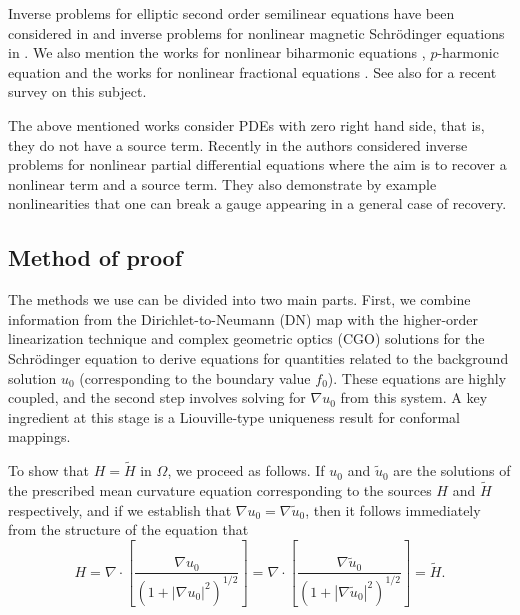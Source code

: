 \documentclass[a4paper, 10pt, twoside, notitlepage]{amsart}
\theoremstyle{plain}
\numberwithin{equation}{section}
\begin{document}
Inverse problems for elliptic second order semilinear equations have been considered in \cite{isakov1994global, victorN, sun2010inverse, imanuvilovyamamoto_semilinear, LLLS2019inverse, LLLS2021b, liimatainen2022inverse, MR4052205,FO19, FLL23, Salo2022, Nurminen2023single, johansson2023inverseproblemssemilinearelliptic, johansson2025inverseproblemssemilinearelliptic} and inverse problems for nonlinear magnetic Schrödinger equations in \cite{Krupchyk2020, Lai2023partial, ma2020note, Krupchyk2024remark}. We also mention the works for nonlinear biharmonic equations \cite{bhatta2025, nurminen2025inverseproblemnonlinearbiharmonic}, $p$-harmonic equation \cite{MR3320025, MR3810150, carstea2025two} and the works for nonlinear fractional equations \cite{Lin2022, lai2019global, LinLiu2023, LaiLin2019}. See also \cite{lassas2025introductioninverseproblemsnonlinear} for a recent survey on this subject.

The above mentioned works consider PDEs with zero right hand side, that is, they do not have a source term. Recently in \cite{liimatainenLin2024,kianliimatainenlin2024} the authors considered inverse problems for nonlinear partial differential equations where the aim is to recover a nonlinear term and a source term. They also demonstrate by example nonlinearities that one can break a gauge appearing in a general case of recovery.

\subsection{Method of proof}
The methods we use can be divided into two main parts. First, we combine information from the Dirichlet-to-Neumann (DN) map with the higher-order linearization technique and complex geometric optics (CGO) solutions for the Schrödinger equation to derive equations for quantities related to the background solution $u_0$ (corresponding to the boundary value $f_0$). These equations are highly coupled, and the second step involves solving for $\nabla u_0$ from this system. A key ingredient at this stage is a Liouville-type uniqueness result for conformal mappings.

To show that $H = \tilde{H}$ in $\Omega$, we proceed as follows. If $u_0$ and $\tilde{u}_0$ are the solutions of the prescribed mean curvature equation corresponding to the sources $H$ and $\tilde{H}$ respectively, and if we establish that $\nabla u_0 = \nabla \tilde{u}_0$, then it follows immediately from the structure of the equation that
\begin{equation*}
    H = \nabla \cdot \left[ \frac{\nabla u_0}{(1 + |\nabla u_0|^2)^{1/2}} \right]
      = \nabla \cdot \left[ \frac{\nabla \tilde{u}_0}{(1 + |\nabla \tilde{u}_0|^2)^{1/2}} \right]
      = \tilde{H}.
\end{equation*}
\end{document}
